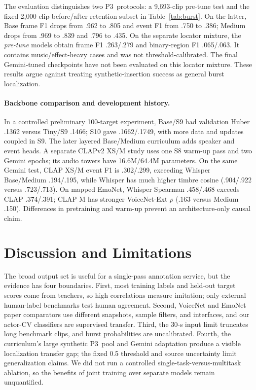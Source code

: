 \documentclass{article}
\newcommand{\pthree}{\textsc{P3}}
\begin{document}
The evaluation distinguishes two \pthree\ protocols: a 9,693-clip pre-tune test and the fixed 2,000-clip before/after retention subset in Table~\ref{tab:burst}. On the latter, Base frame F1 drops from .962 to .805 and event F1 from .750 to .386; Medium drops from .969 to .839 and .796 to .435. On the separate locator mixture, the \emph{pre-tune} models obtain frame F1 .263/.279 and binary-region F1 .065/.063. It contains music/effect-heavy cases and was not threshold-calibrated. The final Gemini-tuned checkpoints have not been evaluated on this locator mixture. These results argue against treating synthetic-insertion success as general burst localization.

\paragraph{Backbone comparison and development history.}
In a controlled preliminary 100-target experiment, Base/S9 had validation Huber .1362 versus Tiny/S9 .1466; S10 gave .1662/.1749, with more data and updates coupled in S9. The later layered Base/Medium curriculum adds speaker and event heads. A separate CLAPv2 XS/M study uses one S8 warm-up pass and two Gemini epochs; its audio towers have 16.6M/64.4M parameters. On the same Gemini test, CLAP XS/M event F1 is .302/.299, exceeding Whisper Base/Medium .194/.195, while Whisper has much higher timbre cosine (.904/.922 versus .723/.713). On mapped EmoNet, Whisper Spearman .458/.468 exceeds CLAP .374/.391; CLAP M has stronger VoiceNet-Ext $\rho$ (.163 versus Medium .150). Differences in pretraining and warm-up prevent an architecture-only causal claim.

\section{Discussion and Limitations}
The broad output set is useful for a single-pass annotation service, but the evidence has four boundaries. First, most training labels and held-out target scores come from teachers, so high correlations measure imitation; only external human-label benchmarks test human agreement. Second, VoiceNet and EmoNet paper comparators use different snapshots, sample filters, and interfaces, and our actor-CV classifiers are supervised transfer. Third, the 30-s input limit truncates long benchmark clips, and burst probabilities are uncalibrated. Fourth, the curriculum's large synthetic \pthree\ pool and Gemini adaptation produce a visible localization transfer gap; the fixed 0.5 threshold and source uncertainty limit generalization claims. We did not run a controlled single-task-versus-multitask ablation, so the benefits of joint training over separate models remain unquantified.
\end{document}
